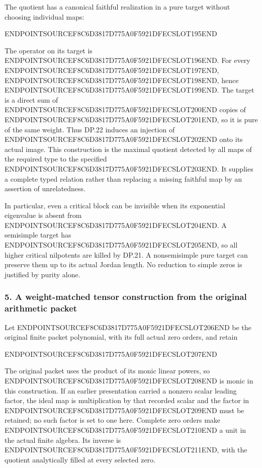 The quotient has a canonical faithful realization in a pure target without choosing individual maps:

ENDPOINTSOURCEF8C6D3817D775A0F5921DFECSLOT195END

The operator on its target is ENDPOINTSOURCEF8C6D3817D775A0F5921DFECSLOT196END. For every ENDPOINTSOURCEF8C6D3817D775A0F5921DFECSLOT197END, ENDPOINTSOURCEF8C6D3817D775A0F5921DFECSLOT198END, hence ENDPOINTSOURCEF8C6D3817D775A0F5921DFECSLOT199END. The target is a direct sum of ENDPOINTSOURCEF8C6D3817D775A0F5921DFECSLOT200END copies of ENDPOINTSOURCEF8C6D3817D775A0F5921DFECSLOT201END, so it is pure of the same weight. Thus DP.22 induces an injection of ENDPOINTSOURCEF8C6D3817D775A0F5921DFECSLOT202END onto its actual image. This construction is the maximal quotient detected by all maps of the required type to the specified ENDPOINTSOURCEF8C6D3817D775A0F5921DFECSLOT203END. It supplies a complete typed relation rather than replacing a missing faithful map by an assertion of unrelatedness.

In particular, even a critical block can be invisible when its exponential eigenvalue is absent from ENDPOINTSOURCEF8C6D3817D775A0F5921DFECSLOT204END. A semisimple target has ENDPOINTSOURCEF8C6D3817D775A0F5921DFECSLOT205END, so all higher critical nilpotents are killed by DP.21. A nonsemisimple pure target can preserve them up to its actual Jordan length. No reduction to simple zeros is justified by purity alone.

\subsubsection{5. A weight-matched tensor construction from the original arithmetic packet}\label{endpoint-purity_review--a-weight-matched-tensor-construction-from-the-original-arithmetic-packet}

Let ENDPOINTSOURCEF8C6D3817D775A0F5921DFECSLOT206END be the original finite packet polynomial, with its full actual zero orders, and retain

ENDPOINTSOURCEF8C6D3817D775A0F5921DFECSLOT207END

The original packet uses the product of its monic linear powers, so ENDPOINTSOURCEF8C6D3817D775A0F5921DFECSLOT208END is monic in this construction. If an earlier presentation carried a nonzero scalar leading factor, the ideal map is multiplication by that recorded scalar and the factor in ENDPOINTSOURCEF8C6D3817D775A0F5921DFECSLOT209END must be retained; no such factor is set to one here. Complete zero orders make ENDPOINTSOURCEF8C6D3817D775A0F5921DFECSLOT210END a unit in the actual finite algebra. Its inverse is ENDPOINTSOURCEF8C6D3817D775A0F5921DFECSLOT211END, with the quotient analytically filled at every selected zero.

